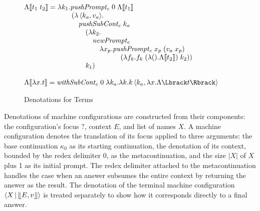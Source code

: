 \documentclass{LMCS}
\newenvironment{boxedarray}[1]
  {\begin{lrbox}{\saveboxedarray}\begin{math}\begin{array}{#1}}
  {\end{array}\end{math}\end{lrbox}\fbox{\usebox{\saveboxedarray}}}
\theoremstyle{plain}
\theoremstyle{remark}
\newcommand{\answer}[1]{\llfloor#1\rrfloor}
\begin{document}
\begin{figure}[ht]
\begin{boxedarray}{@{}l@{}}
      \Lambda |[ t_1\;t_2 |] =  
      \begin{array}[t]{@{}l@{}}
\lambda k_1.\mathit{pushPrompt_c}\; 0\; \Lambda |[ t_1 |] \\
\qquad(\lambda\Braket{k_a,v_a}\!. \\
\qquad\quad\mathit{pushSubCont_c}\; k_a \\
\qquad\qquad(\lambda k_2. \\
\qquad\qquad\quad\mathit{newPrompt_c} \\
\qquad\qquad\qquad\lambda x_p.\mathit{pushPrompt_c}\; x_p\; (v_a\; x_p)  \\
\qquad\qquad\qquad\qquad\quad
(\lambda f_k.f_k\; (\lambda (). \Lambda |[ t_2 |])\; k_2)) \\
\qquad\qquad k_1) \\
      \end{array} \\ \\

      \Lambda |[ \lambda x.t |]  = 
      \begin{array}[t]{@{}l@{}}
\mathit{withSubCont_c}\;0 \;\lambda k_a.\lambda k. k
 \braket{k_a, \lambda x. \Lambda \Lbrack t \Rbrack} \\ 
      \end{array} 
  \end{boxedarray}
  
   \caption{Denotations for Terms}
  \label{fig:cbn-denote-term}
\end{figure}



Denotations of machine configurations are constructed from their components:
the configuration's focus $?$, context $E$, and list of names $X$.  A machine
configuration denotes the translation of its focus applied to three arguments:
the base continuation $\kappa_0$ as its starting continuation, the denotation
of its context, bounded by the redex delimiter $0$, as the metacontinuation,
and the size $\lvert X \rvert$ of $X$ plus 1 as its initial prompt.  The redex
delimiter attached to the metacontinuation handles the case when an answer
subsumes the entire context by returning the answer as the result.  The
denotation of the terminal machine configuration $\Braket{X|\answer{E,v}}$ is
treated separately to show how it corresponds directly to a final answer.
\end{document}
